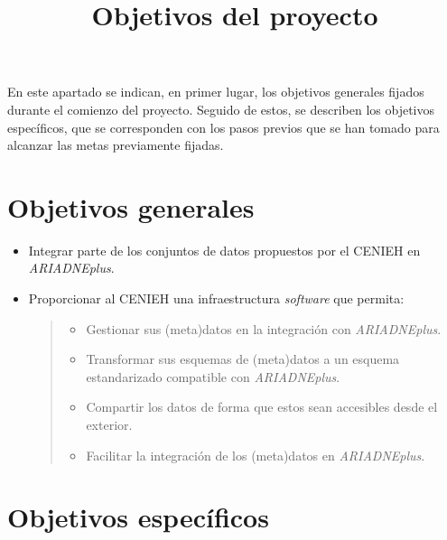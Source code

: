 \documentclass[
]{article}
\title{Objetivos del proyecto}
\author{}
\date{}
\providecommand{\tightlist}{%
  \setlength{\itemsep}{0pt}\setlength{\parskip}{0pt}}
\begin{document}
\maketitle

En este apartado se indican, en primer lugar, los objetivos generales
fijados durante el comienzo del proyecto. Seguido de estos, se describen
los objetivos específicos, que se corresponden con los pasos previos que
se han tomado para alcanzar las metas previamente fijadas.

\hypertarget{objetivos-generales}{%
\section{Objetivos generales}\label{objetivos-generales}}

\begin{itemize}
\item
  Integrar parte de los conjuntos de datos propuestos por el CENIEH en
  \emph{ARIADNEplus}.
\item
  Proporcionar al CENIEH una infraestructura \emph{software} que
  permita:

  \begin{quote}
  \begin{itemize}
  \tightlist
  \item
    Gestionar sus (meta)datos en la integración con \emph{ARIADNEplus}.
  \item
    Transformar sus esquemas de (meta)datos a un esquema estandarizado
    compatible con \emph{ARIADNEplus}.
  \item
    Compartir los datos de forma que estos sean accesibles desde el
    exterior.
  \item
    Facilitar la integración de los (meta)datos en \emph{ARIADNEplus}.
  \end{itemize}
  \end{quote}
\end{itemize}

\hypertarget{objetivos-especuxedficos}{%
\section{Objetivos específicos}\label{objetivos-especuxedficos}}
\end{document}
